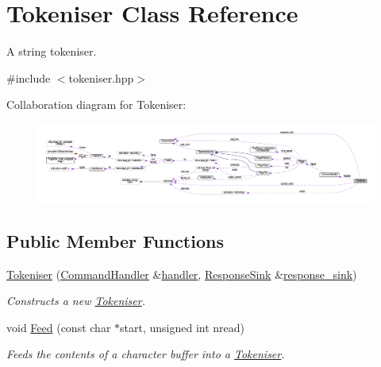 \hypertarget{classTokeniser}{\section{Tokeniser Class Reference}
\label{classTokeniser}
}


A string tokeniser.  




{\ttfamily \#include $<$tokeniser.\+hpp$>$}



Collaboration diagram for Tokeniser\+:
\nopagebreak
\begin{figure}[H]
\begin{center}
\leavevmode
\includegraphics[width=350pt]{classTokeniser__coll__graph}
\end{center}
\end{figure}
\subsection*{Public Member Functions}
\begin{DoxyCompactItemize}
\item 
\hyperlink{classTokeniser_ac69ac105eaf7d81e0632329ee46d2a57}{Tokeniser} (\hyperlink{classCommandHandler}{Command\+Handler} \&\hyperlink{classTokeniser_a779dcc74539e27d10b7d2118fae996e6}{handler}, \hyperlink{classResponseSink}{Response\+Sink} \&\hyperlink{classTokeniser_a5ae6a740655de2f1cbc5f6723dd56439}{response\+\_\+sink})
\begin{DoxyCompactList}\small\item\em Constructs a new \hyperlink{classTokeniser}{Tokeniser}. \end{DoxyCompactList}\item 
void \hyperlink{classTokeniser_ab4b8f1238c89d766a1d72f0ee619406d}{Feed} (const char $\ast$start, unsigned int nread)
\begin{DoxyCompactList}\small\item\em Feeds the contents of a character buffer into a \hyperlink{classTokeniser}{Tokeniser}. \end{DoxyCompactList}\end{DoxyCompactItemize}
